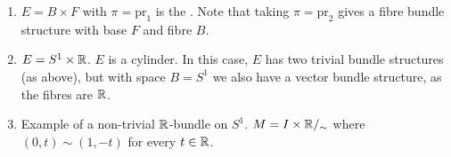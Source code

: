 \documentclass[main.tex]{subfiles}
\begin{document}
\noindent\begin{exmp} 
\begin{enumerate} \hspace{1em} \\ 
    \item  $E = B \times F$ with $\pi = \text{pr}_1$ is the . Note that taking $\pi = \text{pr}_2$ gives a fibre bundle structure with base $F$ and fibre $B$.
    \item $E = S^1 \times \mathbb{R}$. $E$ is a cylinder. In this case, $E$ has two trivial bundle structures (as above), but with space $B = S^1$ we also have a vector bundle structure, as the fibres are $\mathbb{R}$.
    \item {} Example of a non-trivial $\mathbb{R}$-bundle on $S^1$. $M = I \times \mathbb{R}/_\sim$ where $(0,t) \sim (1, -t)$ for every $t \in \mathbb{R}$. 
    

\end{enumerate}
\end{exmp}
\end{document}
